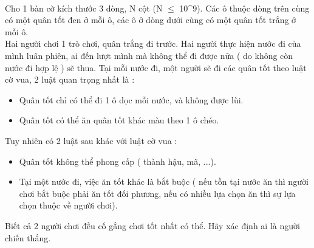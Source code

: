  

Cho 1 bàn cờ kích thước 3 dòng, N cột (N $\le$ 10^9). Các ô thuộc dòng trên cùng có một quân tốt đen ở mỗi ô, các ô ở dòng dưới cùng có một quân tốt trắng ở mỗi ô.
\\Hai người chơi 1 trò chơi, quân trắng đi trước. Hai người thực hiện nước đi của mình luân phiên, ai đến lượt mình mà không thể đi được nữa ( do không còn nước đi hợp lệ ) sẽ thua. Tại mỗi nước đi, một người sẽ đi các quân tốt theo luật cờ vua, 2 luật quan trọng nhất là :
\begin{itemize}
	\item Quân tốt chỉ có thể đi 1 ô dọc mỗi nước, và không được lùi.
	\item Quân tốt có thể ăn quân tốt khác màu theo 1 ô chéo.
\end{itemize}

Tuy nhiên có 2 luật sau khác với luật cờ vua :
\begin{itemize}
	\item Quân tốt không thể phong cấp ( thành hậu, mã, ...).
	\item Tại một nước đi, việc ăn tốt khác là bắt buộc ( nếu tồn tại nước ăn thì người chơi bắt buộc phải ăn tốt đối phương, nếu có nhiều lựa chọn ăn thì sự lựa chọn thuộc về người chơi).
\end{itemize}

Biết cả 2 người chơi đều cố gắng chơi tốt nhất có thể. Hãy xác định ai là người chiến thắng.

\